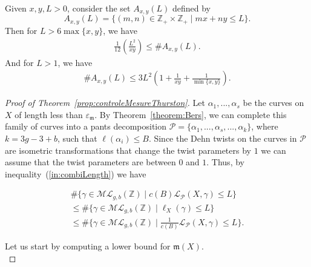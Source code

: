 \documentclass[10pt,a4paper]{amsart}
\begin{document}
\begin{lemme}
    Given $x,y,L>0$, consider the set $A_{x,y}(L)$ defined by
    \[
        A_{x,y}(L)=\{ (m,n) \in \mathbb{Z}_+ \times \mathbb{Z}_+ \mid mx + ny \leqslant L \}.
    \]
    Then for $L>6\max\{x,y\}$, we have
    \begin{align}
        \frac{1}{12}\left( \frac{L^2}{xy} \right) \leqslant \# A_{x,y}(L). \label{rel:AxyMin}
    \end{align}
    And for $L>1$, we have
    \begin{align}
         \# A_{x,y}(L) \leqslant 3L^2\left( 1 + \frac{1}{xy} +\frac{1}{\min\{x,y\}} \right). \label{rel:AxyMaj}
    \end{align}
\end{lemme}

\begin{proof}[Proof of Theorem~\ref{prop:controleMesureThurston}]
    Let $\alpha_1,...,\alpha_s$ be the curves on $X$ of length less than $\varepsilon_{\mathfrak{m}}$. By Theorem~\ref{theorem:Bers}, we can complete this family of curves into a pants decomposition $\mathcal{P}=\{ \alpha_1,...,\alpha_s,...,\alpha_{k} \}$, where $k=3g-3+b$, such that $\ell(\alpha_i) \leqslant B$. Since the Dehn twists on the curves in $\mathcal{P}$ are isometric transformations that change the twist parameters by $1$ we can assume that the twist parameters are between $0$ and $1$. Thus, by inequality~(\ref{in:combiLength}) we have
    
    \begin{multline*}
         \# \{  \gamma \in \mathcal{ML}_{g,b}(\mathbb{Z}) \mid c(B)\mathcal{L}_{\mathcal{P}}(X,\gamma) \leqslant L  \} \\
        \leqslant \# \{ \gamma \in \mathcal{ML}_{g,b}(\mathbb{Z}) \mid \ell_X(\gamma) \leqslant L \} \\ \leqslant \# \{  \gamma \in \mathcal{ML}_{g,b}(\mathbb{Z}) \mid \frac{1}{c(B)}\mathcal{L}_{\mathcal{P}}(X,\gamma) \leqslant L  \}.
    \end{multline*}
    
    Let us start by computing a lower bound for $\mathfrak{m}(X)$.\\
    

\end{proof}
\end{document}
